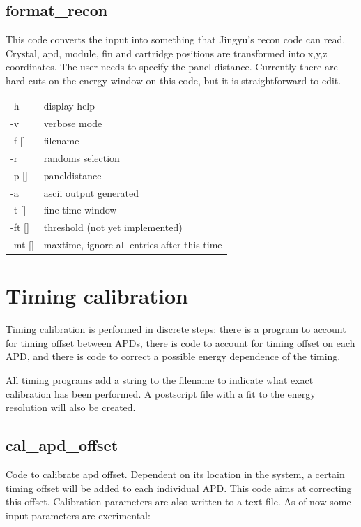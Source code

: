 \documentclass[12pt]{article}
\begin{document}
\subsection{format\_recon}
This code converts the input into something that Jingyu's recon code can read. Crystal, apd, module, fin and cartridge positions are transformed into x,y,z coordinates. The user needs to specify the panel distance. Currently there are hard cuts on the energy window on this code, but it is straightforward to edit. \\

\begin{tabular}{ll}
-h & display help\\
-v & verbose mode \\ 
-f [] & filename \\
-r & randoms selection \\
-p [] & paneldistance \\
-a & ascii output generated\\
-t [] & fine time window \\
-ft [] & threshold (not yet implemented)\\
-mt [] & maxtime, ignore all entries after this time \\ 
\end{tabular}


\section{Timing calibration}
Timing calibration is performed in discrete steps: there is a program to account for timing offset between APDs, there is code to account for timing offset on each APD, and there is code to correct a possible energy dependence of the timing.

All timing programs add a string to the filename to indicate what exact calibration has been performed. A postscript file with a fit to the energy resolution will also be created. 


\subsection{cal\_apd\_offset}
Code to calibrate apd offset. Dependent on its location in the system, a certain timing offset will be added to each individual APD. This code aims at correcting this offset. Calibration parameters are also written to a text file. As of now some input parameters are exerimental:\\
\end{document}
